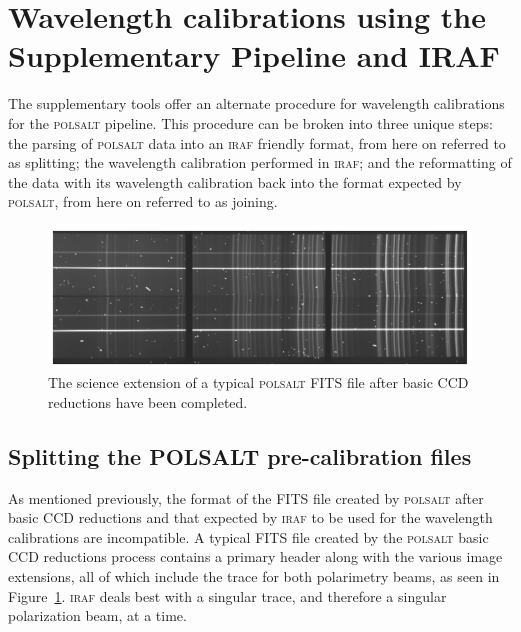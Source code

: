 \section{Wavelength calibrations using the Supplementary Pipeline and IRAF} \label{sec:mod_tools}

The supplementary tools offer an alternate procedure for wavelength calibrations for the \textsc{polsalt} pipeline. This procedure can be broken into three unique steps: the parsing of \textsc{polsalt} data into an \textsc{iraf} friendly format, from here on referred to as splitting; the wavelength calibration performed in \textsc{iraf}; and the reformatting of the data with its wavelength calibration back into the format expected by \textsc{polsalt}, from here on referred to as joining.

\begin{figure}[t]
    \centering
    \includegraphics[width = 1.0\textwidth]{figures/3_pre_wav_cal.pdf}
    \caption{The science extension of a typical \textsc{polsalt} \gls{FITS} file after basic \gls{CCD} reductions have been completed.}
    \label{fig:polsalt_pre_wav_cal}
\end{figure}


\subsection{Splitting the POLSALT pre-calibration files}

As mentioned previously, the format of the \gls{FITS} file created by \textsc{polsalt} after basic \gls{CCD} reductions and that expected by \textsc{iraf} to be used for the wavelength calibrations are incompatible. A typical \gls{FITS} file created by the \textsc{polsalt} basic \gls{CCD} reductions process contains a primary header along with the various image extensions, all of which include the trace for both polarimetry beams, as seen in Figure~\ref{fig:polsalt_pre_wav_cal}. \textsc{iraf} deals best with a singular trace, and therefore a singular polarization beam, at a time.
\prgph

